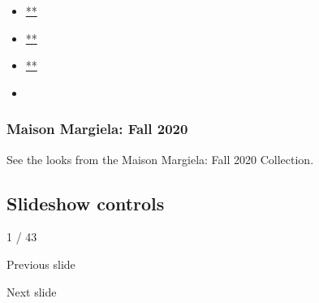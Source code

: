 \begin{itemize}
\item
  \href{https://www.facebookcorewwwi.onion/sharer.php?app_id=9869919170\&u=https\%3A\%2F\%2Fwww.nytimes3xbfgragh.onion\%2Fslideshow\%2F2020\%2F02\%2F26\%2Ffashion\%2Frunway-womens\%2Fmaison-margiela-fall-2020.html\%3Fsmid\%3Dfb-share\&name=Maison\%20Margiela\%3A\%20Fall\%202020\&redirect_uri=https\%3A\%2F\%2Fwww.facebookcorewwwi.onion\%2F}{**}
\item
  \href{https://twitter.com/intent/tweet?url=https\%3A\%2F\%2Fwww.nytimes3xbfgragh.onion\%2Fslideshow\%2F2020\%2F02\%2F26\%2Ffashion\%2Frunway-womens\%2Fmaison-margiela-fall-2020.html\%3Fsmid\%3Dtw-share\&text=Maison\%20Margiela\%3A\%20Fall\%202020}{**}
\item
  \href{mailto:?subject=nytimes3xbfgragh.onion\%3A\%20Maison\%20Margiela\%3A\%20Fall\%202020\&body=From\%20The\%20New\%20York\%20Times\%3A\%0A\%0AMaison\%20Margiela\%3A\%20Fall\%202020\%0A\%0ASee\%20the\%20looks\%20from\%20the\%20Maison\%20Margiela\%3A\%20Fall\%202020\%20Collection.\%0A\%0Ahttps\%3A\%2F\%2Fwww.nytimes3xbfgragh.onion\%2Fslideshow\%2F2020\%2F02\%2F26\%2Ffashion\%2Frunway-womens\%2Fmaison-margiela-fall-2020.html\%3Fsmid\%3Dem-share}{**}
\item
\end{itemize}

\hypertarget{maison-margiela-fall-2020-1}{%
\subsubsection{Maison Margiela: Fall
2020}\label{maison-margiela-fall-2020-1}}

See the looks from the Maison Margiela: Fall 2020 Collection.

\hypertarget{slideshow-controls}{%
\subsection{Slideshow controls}\label{slideshow-controls}}

1 / 43

Previous slide

Next slide
